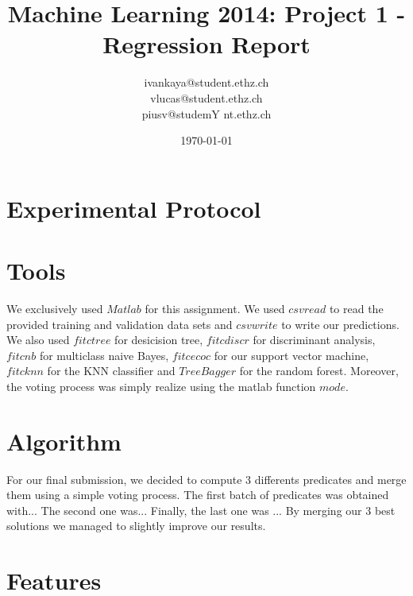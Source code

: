 \documentclass[a4paper, 11pt]{article}
\title{Machine Learning 2014: Project 1 - Regression Report}
\author{ivankaya@student.ethz.ch\\vlucas@student.ethz.ch\\ piusv@studemY nt.ethz.ch\\}
\date{\today}
\begin{document}
\maketitle

\section*{Experimental Protocol}

\section{Tools}

We exclusively used $Matlab$ for this assignment.
We used $csvread$ to read the provided training and validation data sets and $csvwrite$ to write our predictions. We also used $fitctree$ for desicision tree, $fitcdiscr$ for discriminant analysis, $fitcnb$ for multiclass naive Bayes, $fitcecoc$ for our support vector machine, $fitcknn$ for the KNN classifier and $TreeBagger$ for the random forest. Moreover, the voting process was simply realize using the matlab function $mode$.


\section{Algorithm}

For our final submission, we decided to compute 3 differents predicates and merge them using a simple voting process. The first batch of predicates was obtained with... The second one was... Finally, the last one was ...
By merging our 3 best solutions we managed to slightly improve our results.


\section{Features}
\end{document}
